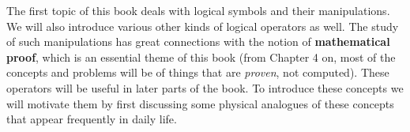 The first topic of this book deals with logical symbols and their manipulations. We will also introduce various other kinds of logical operators as well. The study of such manipulations has great connections with the notion of \textbf{mathematical proof}, which is an essential theme of this book (from Chapter 4 on, most of the concepts and problems will be of things that are \textit{proven}, not computed). These operators will be useful in later parts of the book. To introduce these concepts we will motivate them by first discussing some physical analogues of these concepts that appear frequently in daily life.